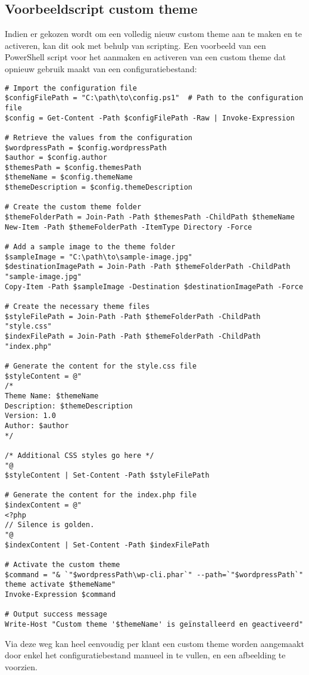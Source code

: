 \subsection{Voorbeeldscript custom theme}
Indien er gekozen wordt om een volledig nieuw custom theme aan te maken en te activeren, kan dit ook met behulp van scripting.
Een voorbeeld van een PowerShell script voor het aanmaken en activeren van een custom theme dat opnieuw gebruik maakt van een configuratiebestand:
\begin{verbatim}
# Import the configuration file
$configFilePath = "C:\path\to\config.ps1"  # Path to the configuration file
$config = Get-Content -Path $configFilePath -Raw | Invoke-Expression

# Retrieve the values from the configuration
$wordpressPath = $config.wordpressPath
$author = $config.author
$themesPath = $config.themesPath
$themeName = $config.themeName
$themeDescription = $config.themeDescription

# Create the custom theme folder
$themeFolderPath = Join-Path -Path $themesPath -ChildPath $themeName
New-Item -Path $themeFolderPath -ItemType Directory -Force

# Add a sample image to the theme folder
$sampleImage = "C:\path\to\sample-image.jpg" 
$destinationImagePath = Join-Path -Path $themeFolderPath -ChildPath "sample-image.jpg"
Copy-Item -Path $sampleImage -Destination $destinationImagePath -Force

# Create the necessary theme files
$styleFilePath = Join-Path -Path $themeFolderPath -ChildPath "style.css"
$indexFilePath = Join-Path -Path $themeFolderPath -ChildPath "index.php"

# Generate the content for the style.css file
$styleContent = @"
/*
Theme Name: $themeName
Description: $themeDescription
Version: 1.0
Author: $author
*/

/* Additional CSS styles go here */
"@
$styleContent | Set-Content -Path $styleFilePath

# Generate the content for the index.php file
$indexContent = @"
<?php
// Silence is golden.
"@
$indexContent | Set-Content -Path $indexFilePath

# Activate the custom theme
$command = "& `"$wordpressPath\wp-cli.phar`" --path=`"$wordpressPath`" theme activate $themeName"
Invoke-Expression $command

# Output success message
Write-Host "Custom theme '$themeName' is geïnstalleerd en geactiveerd"
\end{verbatim}
Via deze weg kan heel eenvoudig per klant een custom theme worden aangemaakt door enkel het configuratiebestand manueel in te vullen, en een afbeelding te voorzien.

